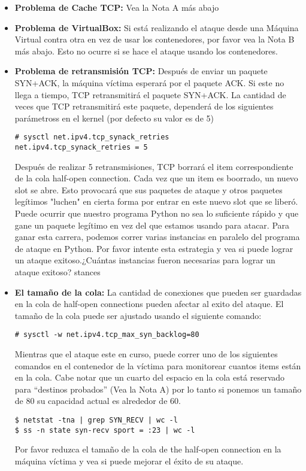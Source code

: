 \begin{itemize}
  \item \textbf{Problema de Cache TCP:} Vea la Nota A más abajo

  \item \textbf{Problema de VirtualBox:} Si está realizando el ataque desde una Máquina Virtual contra otra en vez de usar los contenedores, por favor vea la Nota B más abajo. Esto no ocurre si se hace el ataque usando los contenedores.

  \item \textbf{Problema de retransmisión TCP:} 
  Después de enviar un paquete SYN+ACK, la máquina víctima esperará por el paquete ACK. Si este no llega a tiempo, TCP retransmitirá el paquete SYN+ACK. 
  La cantidad de veces que TCP retransmitirá este paquete, dependerá de los siguientes parámetross en el kernel (por defecto su valor es de 5)
    
\begin{lstlisting}
# sysctl net.ipv4.tcp_synack_retries
net.ipv4.tcp_synack_retries = 5
\end{lstlisting}
	
	Después de realizar 5 retransmisiones, TCP borrará el item correspondiente de la cola half-open connection. Cada vez que un item es boorrado, un nuevo slot se abre. Esto provocará que sus paquetes de ataque y otros paquetes legítimos "luchen" en cierta forma por entrar en este nuevo slot que se liberó. Puede ocurrir que nuestro programa Python no sea lo suficiente rápido y que gane un paquete legítimo en vez del que estamos usando para atacar. Para ganar esta carrera, podemos correr varias instancias en paralelo del programa de ataque en Python. Por favor intente esta estrategia y vea si puede lograr un ataque exitoso.¿Cuántas instancias fueron necesarias para lograr un ataque exitoso?
stances 

  \item \textbf{El tamaño de la cola:}  
  	La cantidad de conexiones que pueden ser guardadas en la cola de  half-open connections pueden afectar al exito del ataque. El tamaño de la cola puede ser ajustado usando el siguiente comando:

\begin{lstlisting}
# sysctl -w net.ipv4.tcp_max_syn_backlog=80
\end{lstlisting}
     
     Mientras que el ataque este en curso, puede correr uno de los siguientes comandos en el contenedor de la víctima para monitorear cuantos items están en la cola. Cabe notar que un cuarto del espacio en la cola está reservado para ``destinos probados'' (Vea la Nota A) por lo tanto si ponemos un tamaño de 80 su capacidad actual es alrededor de 60.
     
\begin{lstlisting}
$ netstat -tna | grep SYN_RECV | wc -l
$ ss -n state syn-recv sport = :23 | wc -l
\end{lstlisting}

	Por favor reduzca el tamaño de la cola de the half-open connection en la máquina víctima y vea si puede mejorar el éxito de su ataque.
\end{itemize}

